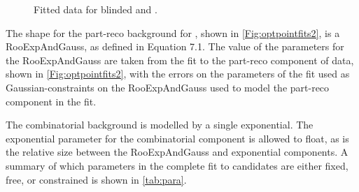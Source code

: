 
\begin{figure}[!ht]\def\nh{0.3\textwidth}
  \centering
    \caption{Fitted data for blinded \Lbpi \protect{} and \LbK \protect{}.}
  \label{Fig:optpointfits2}
\end{figure}


The shape for the part-reco background for \Lbpi, shown in \autoref{Fig:optpointfits2}\protect{}, is a RooExpAndGauss, as defined in Equation 7.1. The value of the parameters for the RooExpAndGauss are taken from the fit to the part-reco component of \LbK data, shown in \autoref{Fig:optpointfits2}\protect{}, with the errors on the parameters of the \LbK fit used as Gaussian-constraints on the RooExpAndGauss used to model the part-reco component in the \Lbpi fit. %

The combinatorial background is modelled by a single exponential. The exponential parameter for the combinatorial component is allowed to float, as is the relative size between the RooExpAndGauss and exponential components. A summary of which parameters in the complete fit to \Lbpi candidates are either fixed, free, or constrained is shown in \autoref{tab:para}. %


